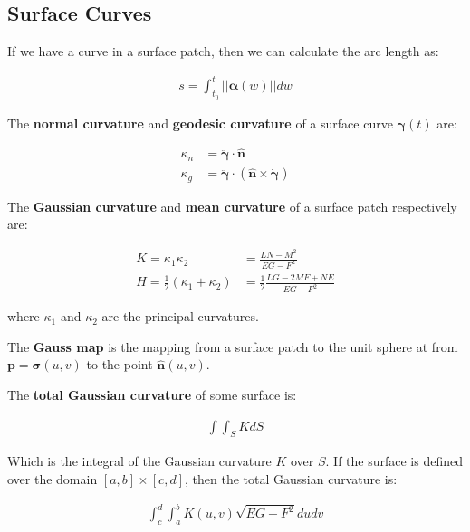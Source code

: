 \documentclass[11pt]{article}
\begin{document}
\subsection{Surface Curves}
\label{sec:orgae30c71}
If we have a curve in a surface patch, then we can calculate the arc length as:

\begin{align*}
    s = \int_{t_{0}}^{t} \lvert\lvert \dot{\boldsymbol{\alpha}}\left(w\right) \lvert\lvert dw
\end{align*}

The \textbf{normal curvature} and \textbf{geodesic curvature} of a surface curve \(\boldsymbol{\gamma}\left(t\right)\) are:

\begin{align*}
    \kappa_{n} &= \ddot{\boldsymbol{\gamma}} \cdot \hat{\boldsymbol{n}} \\
    \kappa_{g} &= \ddot{\boldsymbol{\gamma}} \cdot \left(\hat{\boldsymbol{n}} \times \dot{\boldsymbol{\gamma}}\right)
\end{align*}

The \textbf{Gaussian curvature} and \textbf{mean curvature} of a surface patch respectively are:

\begin{align*}
    K =  \kappa_{1}\kappa_{2} &= \frac{LN - M^{2}}{EG - F^{2}} \\
    H = \frac{1}{2}\left(\kappa_{1} + \kappa_{2}\right) &= \frac{1}{2}\frac{LG - 2MF + NE}{EG-F^{2}}
 \end{align*}

where \(\kappa_{1}\) and \(\kappa_{2}\) are the principal curvatures.

The \textbf{Gauss map} is the mapping from a surface patch to the unit sphere at from \(\boldsymbol{p} = \boldsymbol{\sigma}\left(u,v\right)\) to the point \(\hat{\boldsymbol{n}}\left(u,v\right)\).

The \textbf{total Gaussian curvature} of some surface is:

\begin{align*}
    \int \int_{S} KdS
\end{align*}

Which is the integral of the Gaussian curvature \(K\) over \(S\). If the surface is defined over the domain \(\left[a,b\right] \times \left[c,d\right]\), then the total Gaussian curvature is:

\begin{align*}
    \int_{c}^{d} \int_{a}^{b} K\left(u,v\right)\sqrt{EG-F^{2}}dudv
\end{align*}
\end{document}
